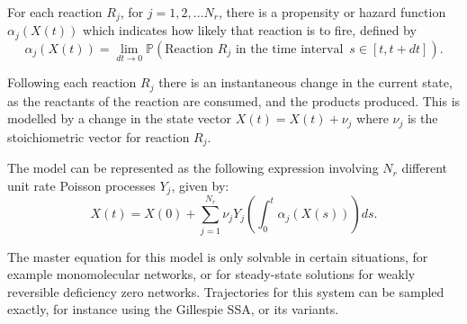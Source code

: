 \documentclass[final]{siamltex}
\begin{document}
For each reaction $R_j$, for $j = 1,2,\ldots N_r$, there is a
propensity or hazard function $\alpha_j(X(t))$ which indicates how
likely that reaction is to fire, defined by
\begin{equation}\alpha_j(X(t)) = \lim_{dt \to 0} \mathbb{P}(\text{Reaction $R_j$ in
    the time interval  } \, s \in [t, t+ dt] ).\end{equation} %

Following each reaction $R_j$ there is an instantaneous change in the
current state, as the reactants of the reaction are consumed, and the
products produced. This is modelled by a change in the state vector
$X(t) = X(t) + \nu_j$ where $\nu_j$ is the stoichiometric vector for
reaction $R_j$.

The model can be represented as the following expression involving
$N_r$ different unit rate Poisson
processes\cite{anderson2011continuous} $Y_j$, given by:
\begin{equation}\label{eq:RTC}
X(t) = X(0) + \sum_{j=1}^{N_r} \nu_j Y_j \left (\int_0^t
  \alpha_j(X(s)) \right ) ds.
\end{equation}

The master equation for this model is only solvable in certain
situations, for example monomolecular networks\cite{jahnke2007solving}, or for
steady-state solutions for weakly reversible deficiency
zero networks\cite{anderson2010product,anderson2016product}. Trajectories for this system can be
sampled exactly, for instance using the Gillespie SSA\cite{gillespie1977exact}, or
its
variants\cite{gillespie2007stochastic,cao2004efficient,anderson2007modified}. 


\end{document}
